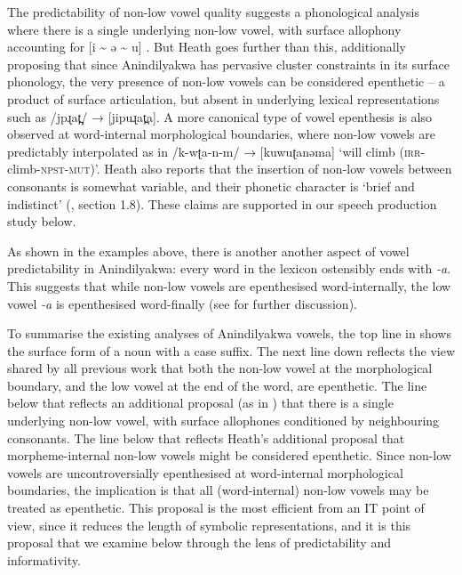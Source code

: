 \documentclass[output=paper,colorlinks,citecolor=brown]{langscibook}
\begin{document}
The predictability of non-low vowel quality suggests a phonological analysis where there is a single underlying non-low vowel, with surface allophony accounting for [i {\textasciitilde} ə {\textasciitilde} u] \citep{Leeding1989}. But Heath goes further than this, additionally proposing that since Anindilyakwa has pervasive cluster constraints in its surface phonology, the very presence of non-low vowels can be considered epenthetic – a product of surface articulation, but absent in underlying lexical representations such as /jpɻat̪/ → [jipuɻat̪a].
A more canonical type of vowel epenthesis is also observed at word-internal morphological boundaries, where non-low vowels are predictably interpolated as in /k-wʈa-n-m/ → [kuwuʈanəma] ‘will climb (\textsc{irr}-climb-\textsc{npst-mut})’. Heath also reports that the insertion of non-low vowels between consonants is somewhat variable, and their phonetic character is ‘brief and indistinct’ (\citealt{Heath:2020aa}, section 1.8). These claims are supported in our speech production study below.

As shown in the examples above, there is another another aspect of vowel predictability in Anindilyakwa: every word in the lexicon ostensibly ends with \textit{{}-a}. This suggests that while non-low vowels are epenthesised word-internally, the low vowel \textit{{}-a} is epenthesised word-finally (see \citealt{vanEgmond2012} for further discussion).

To summarise the existing analyses of Anindilyakwa vowels, the top line in  shows the surface form of a noun with a case suffix. The next line down reflects the view shared by all previous work that both the non-low vowel at the morphological boundary, and the low vowel at the end of the word, are epenthetic. The line below that reflects an additional proposal (as in \citealt{Leeding1989}) that there is a single underlying non-low vowel, with surface allophones conditioned by neighbouring consonants. The line below that reflects Heath's additional proposal that morpheme-internal non-low vowels might be considered epenthetic. Since non-low vowels are uncontroversially epenthesised at word-internal morphological boundaries, the implication is that all (word-internal) non-low vowels may be treated as epenthetic. This proposal is the most efficient from an IT point of view, since it reduces the length of symbolic representations, and it is this proposal that we examine below through the lens of predictability and informativity.

\end{document}
